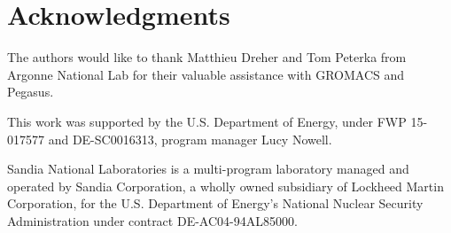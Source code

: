 \section*{Acknowledgments}

The authors would like to thank Matthieu Dreher
and Tom Peterka from Argonne National Lab for their
valuable assistance with GROMACS and Pegasus.

This work was supported by the U.S. Department of
Energy, under FWP 15-017577 and
DE-SC0016313, program manager Lucy Nowell.

Sandia National Laboratories is a multi-program laboratory managed and operated
by Sandia Corporation, a wholly owned subsidiary of Lockheed Martin
Corporation, for the U.S. Department of Energy's National Nuclear Security
Administration under contract DE-AC04-94AL85000.
% 
